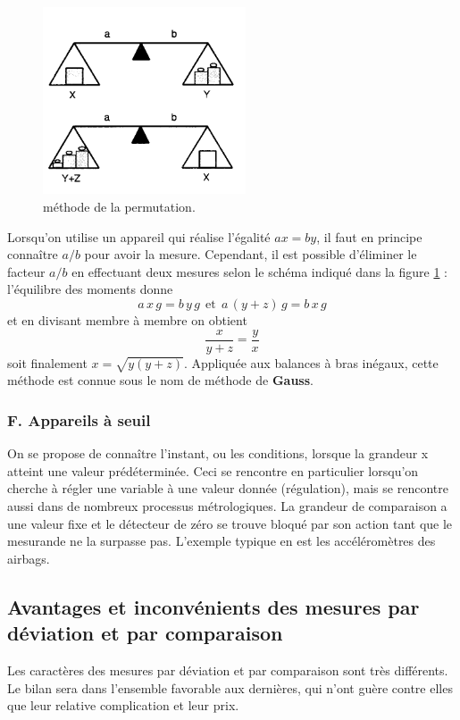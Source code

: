 \begin{figure}
    \vspace{-2cm}
    \centering
    \includegraphics[width=6cm]{assets/figures/perm.pdf}
    \caption{méthode de la permutation.}
    \label{fig:perm}
\end{figure}
Lorsqu'on utilise un appareil qui réalise l'égalité $ax=by$, il faut en principe connaître $a/b$ pour avoir la mesure. Cependant, il est possible d'éliminer le facteur $a/b$ en effectuant deux mesures selon le schéma indiqué dans la figure \ref{fig:perm} : l'équilibre des moments donne
$$
    a\,x\,g=b\,y\,g\ \ \text{et}\ \ a\,(y+z)\,g=b\,x\,g
$$
et en divisant membre à membre on obtient
$$
    \frac{x}{y+z}=\frac{y}{x}
$$
soit finalement $x=\sqrt{y(y+z)}$. Appliquée aux balances à bras inégaux, cette méthode est connue sous le nom de méthode de \textbf{Gauss}.

\subsubsection{F. Appareils à seuil}

On se propose de connaître l'instant, ou les conditions, lorsque la grandeur x atteint une valeur prédéterminée. Ceci se rencontre en particulier lorsqu'on cherche à régler une variable à une valeur donnée (régulation), mais se rencontre aussi dans de nombreux processus métrologiques. La grandeur de comparaison a une valeur fixe et le détecteur de zéro se trouve bloqué par son action tant que le mesurande ne la surpasse pas. L'exemple typique en est les accéléromètres des airbags.

\subsection{Avantages et inconvénients des mesures par déviation et par comparaison}

Les caractères des mesures par déviation et par comparaison sont très différents. Le bilan sera dans l'ensemble favorable aux dernières, qui n'ont guère contre elles que leur relative complication et leur prix.

